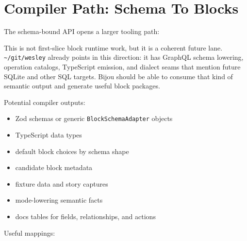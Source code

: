 \section{Compiler Path: Schema To Blocks}\label{record-128-compiler-path-schema-to-blocks}

The schema-bound API opens a larger tooling path:



This is not first-slice block runtime work, but it is a coherent future lane. \texttt{\textasciitilde{}\allowbreak{}/\allowbreak{}g\allowbreak{}i\allowbreak{}t\allowbreak{}/\allowbreak{}w\allowbreak{}e\allowbreak{}s\allowbreak{}l\allowbreak{}e\allowbreak{}y} already points in this direction: it has GraphQL schema lowering, operation catalogs, TypeScript emission, and dialect seams that mention future SQLite and other SQL targets. Bijou should be able to consume that kind of semantic output and generate useful block packages.

Potential compiler outputs:

\begin{itemize}
\tightlist
\item
  Zod schemas or generic \texttt{B\allowbreak{}l\allowbreak{}o\allowbreak{}c\allowbreak{}k\allowbreak{}S\allowbreak{}c\allowbreak{}h\allowbreak{}e\allowbreak{}m\allowbreak{}a\allowbreak{}A\allowbreak{}d\allowbreak{}a\allowbreak{}p\allowbreak{}t\allowbreak{}e\allowbreak{}r} objects
\item
  TypeScript data types
\item
  default block choices by schema shape
\item
  candidate block metadata
\item
  fixture data and story captures
\item
  mode-lowering semantic facts
\item
  docs tables for fields, relationships, and actions
\end{itemize}

Useful mappings:

